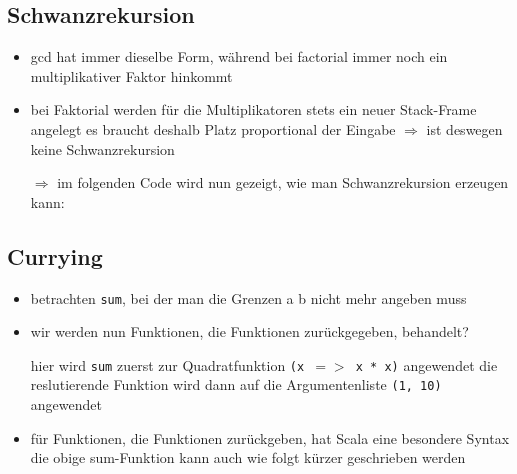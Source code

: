 \subsection{Schwanzrekursion}






\begin{itemize}
  \item gcd hat immer dieselbe Form, während bei factorial immer noch ein
  multiplikativer Faktor hinkommt
  \item bei Faktorial werden für die Multiplikatoren stets ein neuer
  Stack-Frame angelegt \und es braucht deshalb Platz proportional der
  Eingabe $\Rightarrow$ ist deswegen keine Schwanzrekursion
  
  $\Rightarrow$ im folgenden Code wird nun gezeigt, wie man Schwanzrekursion
  erzeugen kann:
  
  
\end{itemize}


\subsection{Currying}
\begin{itemize}
  \item betrachten \texttt{sum}, bei der man die Grenzen a \und b nicht mehr
  angeben muss
  
  
  
  \item wir werden nun Funktionen, die Funktionen zurückgegeben,
  behandelt?
  
  
  
  hier wird \texttt{sum} zuerst zur Quadratfunktion \texttt{(x $=>$ x * x)}
  angewendet \und die reslutierende Funktion wird dann auf die Argumentenliste
  \texttt{(1, 10)} angewendet
  \item für Funktionen, die Funktionen zurückgeben, hat Scala eine besondere
  Syntax \und die obige sum-Funktion kann auch wie folgt kürzer geschrieben
  werden
  
  
  
\end{itemize}
\pagebreak


